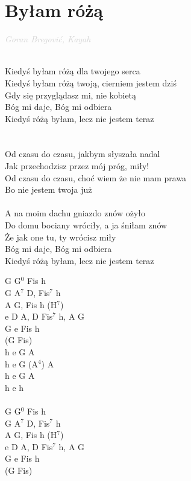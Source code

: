 \documentclass[a5paper, 10pt]{book}
\begin{document}
\section{Byłam różą}\textcolor{lightgray}{\textit{Goran Bregović, Kayah}}\\~\\
\begin{minipage}[t]{0.65\textwidth}
Kiedyś byłam różą dla twojego serca\\
Kiedyś byłam różą twoją, cierniem jestem dziś\\
Gdy się przyglądasz mi, nie kobietą\\
Bóg mi daje, Bóg mi odbiera\\
Kiedyś różą byłam, lecz nie jestem teraz\\
\\
\\
\hspace*{5mm}Od czasu do czasu, jakbym słyszała nadal\\
\hspace*{5mm}Jak przechodzisz przez mój próg, miły!\\
\hspace*{5mm}Od czasu do czasu, choć wiem że nie mam prawa\\
\hspace*{5mm}Bo nie jestem twoja już\\
\\
A na moim dachu gniazdo znów ożyło\\
Do domu bociany wróciły, a ja śniłam znów\\
Że jak one tu, ty wrócisz miły\\
Bóg mi daje, Bóg mi odbiera\\
Kiedyś różą byłam, lecz nie jestem teraz\\
\end{minipage}
\begin{minipage}[t]{0.35\textwidth}
G G$^0$ Fis h\\
G A$^7$ D, Fis$^7$ h\\
A G, Fis h (H$^7$)\\
e D A, D Fis$^7$ h, A G\\
G e Fis h\\
(G Fis)\\

h e G A\\
h e G (A$^4$) A\\
h e G A\\
h e h \\
\\
G G$^0$ Fis h\\
G A$^7$ D, Fis$^7$ h\\
A G, Fis h (H$^7$)\\
e D A, D Fis$^7$ h, A G\\
G e Fis h\\
(G Fis)\\
\end{minipage}
\end{document}
